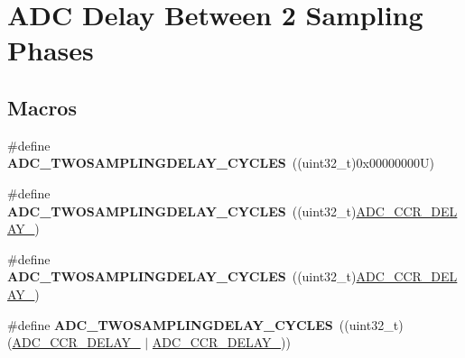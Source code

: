 \hypertarget{group___a_d_c__delay__between__2__sampling__phases}{}\section{A\+DC Delay Between 2 Sampling Phases}
\label{group___a_d_c__delay__between__2__sampling__phases}
\subsection*{Macros}
\begin{DoxyCompactItemize}
\item 
\mbox{\label{group___a_d_c__delay__between__2__sampling__phases_gaf809f893a5fb22f6003d7248e484a991}} 
\#define {\bfseries A\+D\+C\+\_\+\+T\+W\+O\+S\+A\+M\+P\+L\+I\+N\+G\+D\+E\+L\+A\+Y\+\_\+C\+Y\+C\+L\+ES}~((uint32\+\_\+t)0x00000000\+U)
\item 
\mbox{\label{group___a_d_c__delay__between__2__sampling__phases_ga3d731370a25ed30d8c1dae716d14b8bf}} 
\#define {\bfseries A\+D\+C\+\_\+\+T\+W\+O\+S\+A\+M\+P\+L\+I\+N\+G\+D\+E\+L\+A\+Y\+\_\+C\+Y\+C\+L\+ES}~((uint32\+\_\+t)\mbox{\hyperlink{group___peripheral___registers___bits___definition_ga22b71e9df8b1fca93802ad602341eb0b}{A\+D\+C\+\_\+\+C\+C\+R\+\_\+\+D\+E\+L\+A\+Y\+\_}})
\item 
\mbox{\label{group___a_d_c__delay__between__2__sampling__phases_ga630f7e758937ff7d1705ef4894227f08}} 
\#define {\bfseries A\+D\+C\+\_\+\+T\+W\+O\+S\+A\+M\+P\+L\+I\+N\+G\+D\+E\+L\+A\+Y\+\_\+C\+Y\+C\+L\+ES}~((uint32\+\_\+t)\mbox{\hyperlink{group___peripheral___registers___bits___definition_ga6d0d5785cb6c75e700517e88af188573}{A\+D\+C\+\_\+\+C\+C\+R\+\_\+\+D\+E\+L\+A\+Y\+\_}})
\item 
\mbox{\label{group___a_d_c__delay__between__2__sampling__phases_ga4a36c5233614aa76e4d911677c26067b}} 
\#define {\bfseries A\+D\+C\+\_\+\+T\+W\+O\+S\+A\+M\+P\+L\+I\+N\+G\+D\+E\+L\+A\+Y\+\_\+C\+Y\+C\+L\+ES}~((uint32\+\_\+t)(\mbox{\hyperlink{group___peripheral___registers___bits___definition_ga6d0d5785cb6c75e700517e88af188573}{A\+D\+C\+\_\+\+C\+C\+R\+\_\+\+D\+E\+L\+A\+Y\+\_}} $\vert$ \mbox{\hyperlink{group___peripheral___registers___bits___definition_ga22b71e9df8b1fca93802ad602341eb0b}{A\+D\+C\+\_\+\+C\+C\+R\+\_\+\+D\+E\+L\+A\+Y\+\_}}))

\end{DoxyCompactItemize}
